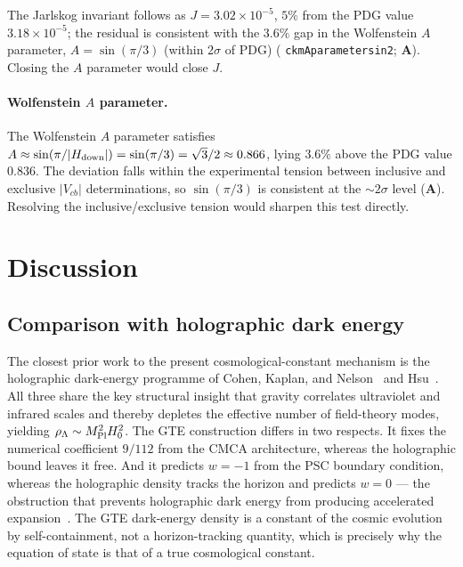 \documentclass[11pt]{article}
\theoremstyle{remark}
\newcommand{\lean}[1]{%
  \penalty-100
  \begingroup\def\_{\textunderscore\allowbreak}\texttt{#1}\endgroup}
\newcommand{\MPl}{M_{\rm Pl}}
\newcommand{\Hnought}{H_0}
\newcommand{\CMCA}{\text{CMCA}}
\newcommand{\CatA}{\textbf{A}}
\begin{document}
The Jarlskog invariant follows as $J = 3.02\times10^{-5}$, $5\%$ from the PDG value
$3.18\times10^{-5}$; the residual is consistent with the $3.6\%$ gap in the
Wolfenstein $A$ parameter, $A = \sin(\pi/3)$ (within $2\sigma$ of PDG)
(\lean{ckm\_A\_parameter\_sin2}; \CatA). Closing the $A$ parameter would close $J$.

\paragraph{Wolfenstein $A$ parameter.}
The Wolfenstein $A$ parameter satisfies $A \approx \sin(\pi/|H_{\rm down}|) =
\sin(\pi/3) = \sqrt{3}/2 \approx 0.866$, lying $3.6\%$ above the PDG value $0.836$.
The deviation falls within the experimental tension between inclusive and exclusive
$|V_{cb}|$ determinations, so $\sin(\pi/3)$ is consistent at the ${\sim}2\sigma$
level (\CatA). Resolving the inclusive/exclusive tension would sharpen this test
directly.

\section{Discussion}
\label{sec:discussion}

\subsection{Comparison with holographic dark energy}

The closest prior work to the present cosmological-constant mechanism is the
holographic dark-energy programme of Cohen, Kaplan, and
Nelson~\cite{CohenKaplanNelson1999} and Hsu~\cite{Hsu2004}. All three share the
key structural insight that gravity correlates ultraviolet and infrared scales and
thereby depletes the effective number of field-theory modes, yielding $\rho_\Lambda
\sim \MPl^2\Hnought^2$. The GTE construction differs in two respects. It fixes the
numerical coefficient $9/112$ from the $\CMCA$ architecture, whereas the holographic
bound leaves it free. And it predicts $w = -1$ from the PSC boundary condition,
whereas the holographic density tracks the horizon and predicts $w = 0$ --- the
obstruction that prevents holographic dark energy from producing accelerated
expansion~\cite{Hsu2004}. The GTE dark-energy density is a constant of the cosmic
evolution by self-containment, not a horizon-tracking quantity, which is precisely
why the equation of state is that of a true cosmological constant.
\end{document}
